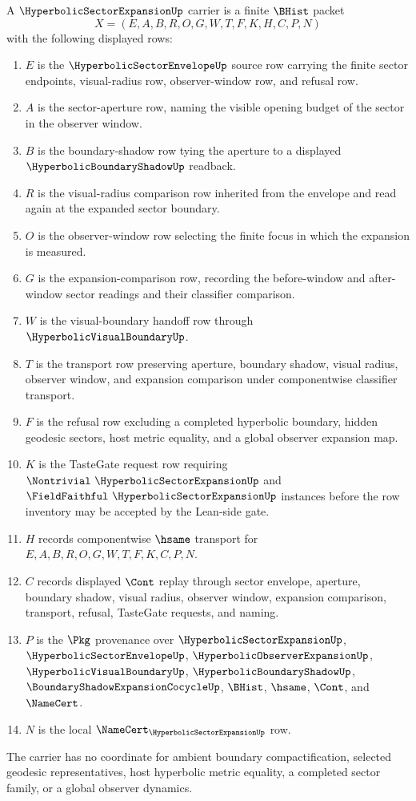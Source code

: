 \begin{definition}
\label{def:hyperbolic-sector-expansion-carrier}
A $\HyperbolicSectorExpansionUp$ carrier is a finite $\BHist$ packet
$$
X=(E,A,B,R,O,G,W,T,F,K,H,C,P,N)
$$
with the following displayed rows:
\begin{enumerate}
\item $E$ is the $\HyperbolicSectorEnvelopeUp$ source row carrying the finite
sector endpoints, visual-radius row, observer-window row, and refusal row.
\item $A$ is the sector-aperture row, naming the visible opening budget of the
sector in the observer window.
\item $B$ is the boundary-shadow row tying the aperture to a displayed
$\HyperbolicBoundaryShadowUp$ readback.
\item $R$ is the visual-radius comparison row inherited from the envelope and
read again at the expanded sector boundary.
\item $O$ is the observer-window row selecting the finite focus in which the
expansion is measured.
\item $G$ is the expansion-comparison row, recording the before-window and
after-window sector readings and their classifier comparison.
\item $W$ is the visual-boundary handoff row through
$\HyperbolicVisualBoundaryUp$.
\item $T$ is the transport row preserving aperture, boundary shadow, visual
radius, observer window, and expansion comparison under componentwise
classifier transport.
\item $F$ is the refusal row excluding a completed hyperbolic boundary, hidden
geodesic sectors, host metric equality, and a global observer expansion map.
\item $K$ is the TasteGate request row requiring $\Nontrivial\
\HyperbolicSectorExpansionUp$ and $\FieldFaithful\
\HyperbolicSectorExpansionUp$ instances before the row inventory may be
accepted by the Lean-side gate.
\item $H$ records componentwise $\hsame$ transport for
$E,A,B,R,O,G,W,T,F,K,C,P,N$.
\item $C$ records displayed $\Cont$ replay through sector envelope, aperture,
boundary shadow, visual radius, observer window, expansion comparison,
transport, refusal, TasteGate requests, and naming.
\item $P$ is the $\Pkg$ provenance over $\HyperbolicSectorExpansionUp$,
$\HyperbolicSectorEnvelopeUp$, $\HyperbolicObserverExpansionUp$,
$\HyperbolicVisualBoundaryUp$, $\HyperbolicBoundaryShadowUp$,
$\BoundaryShadowExpansionCocycleUp$, $\BHist$, $\hsame$, $\Cont$, and
$\NameCert$.
\item $N$ is the local $\NameCert_{\HyperbolicSectorExpansionUp}$ row.
\end{enumerate}
The carrier has no coordinate for ambient boundary compactification, selected
geodesic representatives, host hyperbolic metric equality, a completed sector
family, or a global observer dynamics.
\end{definition}

